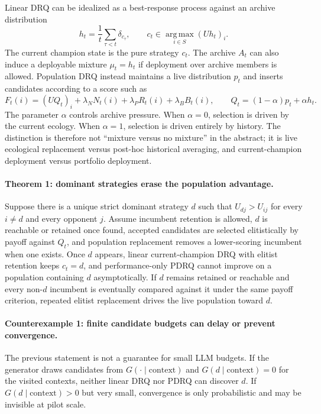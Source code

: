 \documentclass[11pt]{article}
\begin{document}
Linear DRQ can be idealized as a best-response process against an archive distribution
\[
h_t = \frac{1}{t}\sum_{\tau<t}\delta_{c_\tau},
\qquad
c_t\in \operatorname*{arg\,max}_{i\in S} (U h_t)_i.
\]
The current champion state is the pure strategy $c_t$. The archive $A_t$ can also induce a deployable mixture $\mu_t=h_t$ if deployment over archive members is allowed. Population DRQ instead maintains a live distribution $p_t$ and inserts candidates according to a score such as
\[
F_t(i)=(U Q_t)_i+\lambda_N N_t(i)+\lambda_P R_t(i)+\lambda_B B_t(i),
\qquad
Q_t=(1-\alpha)p_t+\alpha h_t .
\]
The parameter $\alpha$ controls archive pressure. When $\alpha=0$, selection is driven by the current ecology. When $\alpha=1$, selection is driven entirely by history. The distinction is therefore not ``mixture versus no mixture'' in the abstract; it is live ecological replacement versus post-hoc historical averaging, and current-champion deployment versus portfolio deployment.

\paragraph{Theorem 1: dominant strategies erase the population advantage.}
Suppose there is a unique strict dominant strategy $d$ such that $U_{dj}>U_{ij}$ for every $i\neq d$ and every opponent $j$. Assume incumbent retention is allowed, $d$ is reachable or retained once found, accepted candidates are selected elitistically by payoff against $Q_t$, and population replacement removes a lower-scoring incumbent when one exists. Once $d$ appears, linear current-champion DRQ with elitist retention keeps $c_t=d$, and performance-only PDRQ cannot improve on a population containing $d$ asymptotically. If $d$ remains retained or reachable and every non-$d$ incumbent is eventually compared against it under the same payoff criterion, repeated elitist replacement drives the live population toward $d$.

\paragraph{Counterexample 1: finite candidate budgets can delay or prevent convergence.}
The previous statement is not a guarantee for small LLM budgets. If the generator draws candidates from $G(\cdot\mid\mathrm{context})$ and $G(d\mid\mathrm{context})=0$ for the visited contexts, neither linear DRQ nor PDRQ can discover $d$. If $G(d\mid\mathrm{context})>0$ but very small, convergence is only probabilistic and may be invisible at pilot scale.
\end{document}
